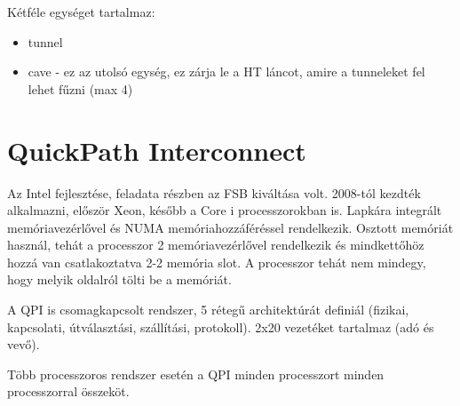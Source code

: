 Kétféle egységet tartalmaz:
\begin{itemize}
    \item tunnel
    \item cave - ez az utolsó egység, ez zárja le a HT láncot, amire a tunneleket fel lehet fűzni (max 4)
\end{itemize}

\section{QuickPath Interconnect}
Az Intel fejlesztése, feladata részben az FSB kiváltása volt.
2008-tól kezdték alkalmazni, először Xeon, később a Core i processzorokban is.
Lapkára integrált memóriavezérlővel és NUMA memóriahozzáféréssel rendelkezik.
Osztott memóriát használ, tehát a processzor 2 memóriavezérlővel rendelkezik és mindkettőhöz hozzá van csatlakoztatva 2-2 memória slot.
A processzor tehát nem mindegy, hogy melyik oldalról tölti be a memóriát.

A QPI is csomagkapcsolt rendszer, 5 rétegű architektúrát definiál (fizikai, kapcsolati, útválasztási, szállítási, protokoll).
2x20 vezetéket tartalmaz (adó és vevő).

Több processzoros rendszer esetén a QPI minden processzort minden processzorral összeköt.
